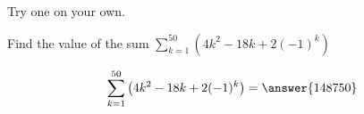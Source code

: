 \documentclass[12pt]{ximera}
\begin{document}
Try one on your own.
\begin{question}
	Find the value of the sum $\displaystyle \sum_{k=1}^{50} \left( 4k^2-18k + 2(-1)^k \right)$
	
	\[ \sum_{k=1}^{50} \left( 4k^2 - 18k + 2(-1)^k \right) = \answer{148750} \]
\end{question}
\end{document}

